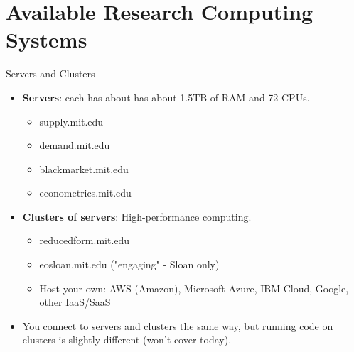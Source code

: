 \documentclass{beamer}
\begin{document}
\section{Available Research Computing Systems}
\begin{frame}{Servers and Clusters}
    \begin{itemize}
        \item \textbf{Servers}: each has about has about 1.5TB of RAM and 72 CPUs.
        \begin{itemize}
            \item supply.mit.edu
            \item demand.mit.edu
            \item blackmarket.mit.edu
            \item econometrics.mit.edu
        \end{itemize}
        \item \textbf{Clusters of servers}: High-performance computing.
       \begin{itemize}
            \item reducedform.mit.edu
            \item eosloan.mit.edu ("engaging" - Sloan only)
            \item Host your own: AWS (Amazon), Microsoft Azure, IBM Cloud, Google, other IaaS/SaaS
       \end{itemize}
       \item You connect to servers and clusters the same way, but running code on clusters is slightly different (won't cover today).
 \end{itemize}
\end{frame}
\end{document}
